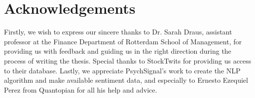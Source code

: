 \section{Acknowledgements}
Firstly, we wish to express our sincere thanks to Dr. Sarah Draus, assistant professor at the Finance Department of Rotterdam School of Management, for providing us with feedback and guiding us in the right direction during the process of writing the thesis. Special thanks to StockTwits for providing us access to their database. Lastly, we appreciate PsychSignal's work to create the NLP algorithm and make available sentiment data, and especially to Ernesto Ezequiel Perez from Quantopian for all his help and advice.